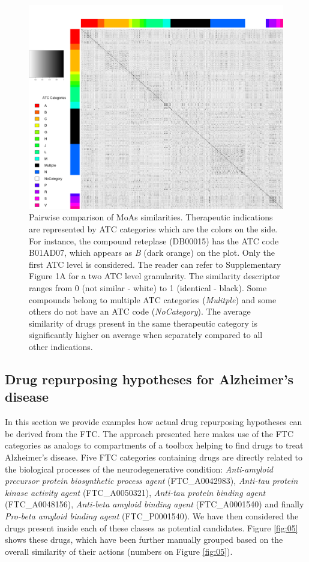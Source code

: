 \documentclass{bioinfo}
\begin{document}
\begin{figure}[!tpb]%
\centerline{\includegraphics{fig4.png}}
\caption{Pairwise comparison of MoAs similarities. Therapeutic indications are represented by ATC categories which are the colors on the side.
For instance, the compound reteplase (DB00015) has the ATC code B01AD07, 
which appears as \emph{B} (dark orange) on the plot.
Only the first ATC level 
is considered. The reader can refer to Supplementary Figure 1A for a two ATC level granularity. 
The similarity descriptor ranges from 0 (not similar - white) to 1 (identical - black).
Some compounds belong to multiple ATC categories (\emph{Mulitple}) and some others do not have
an ATC code (\emph{NoCategory}).
The average similarity of drugs present in the same therapeutic category 
is significantly higher on average when separately compared to all other indications.}\label{fig:04}
\end{figure}

\subsection{Drug repurposing hypotheses for Alzheimer's disease}
In this section we provide examples how actual drug repurposing hypotheses can be derived from the FTC. 
The approach presented here makes use of the FTC categories as analogs to compartments of a toolbox helping to 
find drugs to treat Alzheimer's disease. Five FTC categories containing drugs are directly related to the biological 
processes of the neurodegenerative condition: \emph{Anti-amyloid precursor protein biosynthetic process agent} (FTC\_A0042983), 
\emph{Anti-tau protein kinase activity agent} (FTC\_A0050321), \emph{Anti-tau protein binding agent} (FTC\_A0048156), 
\emph{Anti-beta amyloid 
binding agent} (FTC\_A0001540) and finally \emph{Pro-beta amyloid binding agent} (FTC\_P0001540). We have then considered the drugs present 
inside each of these classes as potential candidates. Figure \ref{fig:05} shows these drugs, which have been further manually grouped 
based on the overall similarity of their actions (numbers on Figure \ref{fig:05}).
\end{document}
